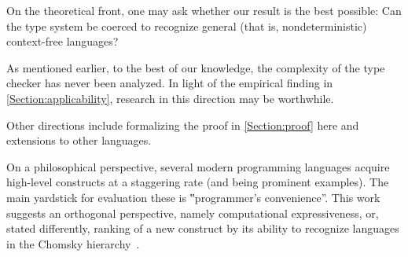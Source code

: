 On the theoretical front, one may ask whether
  our result is the best possible:
Can the \Java type system be coerced to recognize
  general (that is, nondeterministic) context-free languages?

As mentioned earlier, to the best of our knowledge,
  the complexity of the \Java type checker has never been analyzed.
In light of the empirical finding in \cref{Section:applicability},
  research in this direction may be worthwhile.

Other directions include
  formalizing the proof in \cref{Section:proof} here and
  extensions to other languages.

On a philosophical perspective, several modern programming languages
  acquire high-level constructs at a staggering rate
  (\CC and \Scala being prominent examples).
The main yardstick for evaluation these
  is ‟programmer's convenience”.
This work suggests an orthogonal perspective, namely
  computational expressiveness, or, stated differently,
    ranking of a new construct by its ability to recognize languages
    in the Chomsky hierarchy~\cite{Chomsky:1963}.
